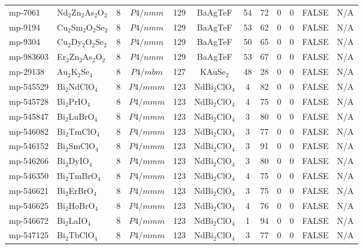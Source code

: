 {\begin{longtable}{llcccccccccc}
    mp-7061 & Nd$_{2}$Zn$_{2}$As$_{2}$O$_{2}$ & 8     & $P4/nmm$ & 129   & BaAgTeF & 54    & 72    & 0     & 0     & FALSE & N/A \\
    mp-9194 & Cu$_{2}$Sm$_{2}$O$_{2}$Se$_{2}$ & 8     & $P4/nmm$ & 129   & BaAgTeF & 53    & 62    & 0     & 0     & FALSE & N/A \\
    mp-9304 & Cu$_{2}$Dy$_{2}$O$_{2}$Se$_{2}$ & 8     & $P4/nmm$ & 129   & BaAgTeF & 50    & 65    & 0     & 0     & FALSE & N/A \\
    mp-983603 & Er$_{2}$Zn$_{2}$As$_{2}$O$_{2}$ & 8     & $P4/nmm$ & 129   & BaAgTeF & 53    & 67    & 0     & 0     & FALSE & N/A \\
    mp-29138 & Au$_{2}$K$_{2}$Se$_{4}$ & 8     & $P4/mbm$ & 127   & KAuSe$_{2}$ & 48    & 28    & 0     & 0     & FALSE & N/A \\
    mp-545529 & Bi$_{2}$NdClO$_{4}$ & 8     & $P4/mmm$ & 123   & NdBi$_{2}$ClO$_{4}$ & 4     & 82    & 0     & 0     & FALSE & N/A \\
    mp-545728 & Bi$_{2}$PrIO$_{4}$ & 8     & $P4/mmm$ & 123   & NdBi$_{2}$ClO$_{4}$ & 4     & 75    & 0     & 0     & FALSE & N/A \\
    mp-545847 & Bi$_{2}$LuBrO$_{4}$ & 8     & $P4/mmm$ & 123   & NdBi$_{2}$ClO$_{4}$ & 3     & 80    & 0     & 0     & FALSE & N/A \\
    mp-546082 & Bi$_{2}$TmClO$_{4}$ & 8     & $P4/mmm$ & 123   & NdBi$_{2}$ClO$_{4}$ & 3     & 77    & 0     & 0     & FALSE & N/A \\
    mp-546152 & Bi$_{2}$SmClO$_{4}$ & 8     & $P4/mmm$ & 123   & NdBi$_{2}$ClO$_{4}$ & 3     & 91    & 0     & 0     & FALSE & N/A \\
    mp-546266 & Bi$_{2}$DyIO$_{4}$ & 8     & $P4/mmm$ & 123   & NdBi$_{2}$ClO$_{4}$ & 3     & 80    & 0     & 0     & FALSE & N/A \\
    mp-546350 & Bi$_{2}$TmBrO$_{4}$ & 8     & $P4/mmm$ & 123   & NdBi$_{2}$ClO$_{4}$ & 4     & 75    & 0     & 0     & FALSE & N/A \\
    mp-546621 & Bi$_{2}$ErBrO$_{4}$ & 8     & $P4/mmm$ & 123   & NdBi$_{2}$ClO$_{4}$ & 3     & 75    & 0     & 0     & FALSE & N/A \\
    mp-546625 & Bi$_{2}$HoBrO$_{4}$ & 8     & $P4/mmm$ & 123   & NdBi$_{2}$ClO$_{4}$ & 4     & 76    & 0     & 0     & FALSE & N/A \\
    mp-546672 & Bi$_{2}$LaIO$_{4}$ & 8     & $P4/mmm$ & 123   & NdBi$_{2}$ClO$_{4}$ & 1     & 94    & 0     & 0     & FALSE & N/A \\
    mp-547125 & Bi$_{2}$TbClO$_{4}$ & 8     & $P4/mmm$ & 123   & NdBi$_{2}$ClO$_{4}$ & 3     & 77    & 0     & 0     & FALSE & N/A \\

\end{longtable}}
